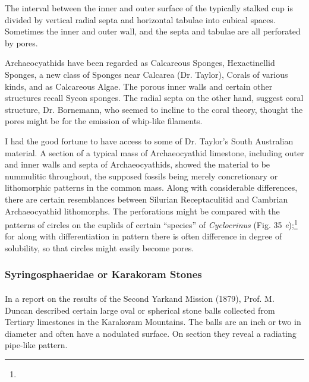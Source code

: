 \documentclass[a4paper, 12pt, oneside]{article}
\begin{document}
The interval between the inner and outer surface of the typically stalked cup is divided by vertical radial septa and horizontal tabulae into cubical spaces. Sometimes the inner and outer wall, and the septa and tabulae are all perforated by pores.

Archaeocyathids have been regarded as Calcareous Sponges, Hexactinellid Sponges, a new class of Sponges near Calcarea (Dr. Taylor), Corals of various kinds, and as Calcareous Algae. The porous inner walls and certain other structures recall Sycon sponges. The radial septa on the other hand, suggest coral structure, Dr. Bornemann, who seemed to incline to the coral theory, thought the pores might be for the emission of whip-like filaments.

I had the good fortune to have access to some of Dr. Taylor's South Australian material. A section of a typical mass of Archaeocyathid limestone, including outer and inner walls and septa of Archaeocyathids, showed the material to be nummulitic throughout, the supposed fossils being merely concretionary or lithomorphic patterns in the common mass. Along with considerable differences, there are certain resemblances between Silurian Receptaculitid and Cambrian Archaeocyathid lithomorphs. The perforations might be compared with the patterns of circles on the cuplids of certain ``species'' of \emph{Cyclocrinus} (Fig. 35 \emph{e});\footnote{} for along with differentiation in pattern there is often difference in degree of solubility, so that circles might easily become pores.

\subsubsection{Syringosphaeridae or Karakoram Stones}
\paragraph{}
In a report on the results of the Second Yarkand Mission (1879), Prof. M. Duncan described certain large oval or spherical stone balls collected from Tertiary limestones in the Karakoram Mountains. The balls are an inch or two in diameter and often have a nodulated surface. On section they reveal a radiating pipe-like pattern.
\end{document}
